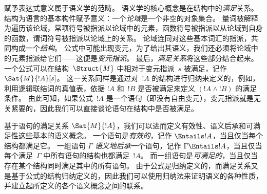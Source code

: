 \documentclass[../../../include/open-logic-section]{subfiles}
\begin{document}



赋予表达式意义属于语义学的范畴。
语义学的核心概念是在结构中的\emph{满足}关系。
结构为语言的基本构件赋予意义：一个\emph{论域}是一个非空的对象集合。
量词被解释为遍历该论域，常项符号被指派以论域中的元素，函数符号被指派以从论域到自身的函数，谓词符号被指派以论域上的关系。
论域连同对这些基本词汇的指派，共同构成一个\emph{结构}。
公式中可能出现变元，为了给出其语义，我们还必须将论域中的元素指派给它们——这便是\emph{变元指派}。
最后，\emph{满足关系}将这些部分结合起来。
一个公式可以在结构~$\Struct{M}$ 中相对于变元指派~$s$ 被满足，记作 $\Sat{M}{!A}[s]$。
这一关系同样是通过对~$!A$ 的结构进行归纳来定义的，例如，利用逻辑联结词的真值表，依据 $!A$ 和~$!B$ 是否被满足来定义 $(!A \land !B)$ 的满足条件。
由此可知，如果公式~$!A$ 是一个语句（即没有自由变元），变元指派就是无关紧要的，因此我们可以直接谈论语句在结构中是否被满足。

基于语句的满足关系 $\Sat{M}{!A}$，我们可以进而定义有效性、语义后承和可满足性这些基本的语义概念。
一个语句是\emph{有效的}，记作 $\Entails !A$，当且仅当每个结构都满足它。
一组语句 $\Gamma$ \emph{语义地后承}一个语句，记作 $\Gamma \Entails !A$，当且仅当每个满足~$\Gamma$ 中所有语句的结构也都满足~$!A$。
而一组语句是\emph{可满足的}，当且仅当存在某个结构同时满足其中的所有语句。
由于公式是归纳定义的，而满足关系又是基于公式的结构归纳定义的，因此我们可以使用归纳法来证明语义的各种性质，并建立起所定义的各个语义概念之间的联系。
\end{document}
